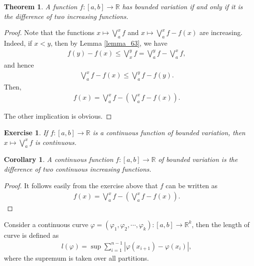 \documentclass[11pt]{book}
\newtheorem{theorem}{Theorem}[chapter]
\newtheorem{corollary}{Corollary}[theorem]
\newtheorem{exercise}{Exercise}[section]
\theoremstyle{definition}
\numberwithin{equation}{chapter}
\begin{document}
\medskip

\begin{theorem}
A function $f: [a,b] \to \mathbb{R}$ has bounded variation if and only if it is the difference of two increasing functions.
\end{theorem}
\begin{proof}
Note that the functions $x \mapsto \bigvee^x_a f$ and $x \mapsto \bigvee^x_a f - f(x)$ are increasing. Indeed, if $x < y$, then by Lemma \ref{lemma_63}, we have
\begin{align*}
    f(y) - f(x) \leq \bigvee^y_x f = \bigvee^y_a f - \bigvee^x_a f,
\end{align*}
and hence
\begin{align*}
    \bigvee^x_a f - f(x) \leq \bigvee^y_a f - f(y).
\end{align*}
Then, 
\begin{align*}
    f(x) = \bigvee^x_a f - \left(\bigvee^x_a f - f(x)\right).
\end{align*}

The other implication is obvious.
\end{proof}

\medskip

\begin{exercise}
If $f: [a,b] \to \mathbb{R}$ is a continuous function of bounded variation, then $x \mapsto \bigvee^x_a f$ is continuous.
\end{exercise}

\medskip

\begin{corollary}
A continuous function $f: [a,b] \to \mathbb{R}$ of bounded variation is the difference of two continuous increasing functions.
\end{corollary}
\begin{proof}
It follows easily from the exercise above that $f$ can be written as
\begin{align*}
    f(x) = \bigvee^x_a f - \left(\bigvee^x_a f - f(x)\right).
\end{align*}
\end{proof}

\medskip

Consider a continuous curve $\varphi = (\varphi_1, \varphi_2, \cdots, \varphi_k): [a,b] \to \mathbb{R}^k$, then the length of curve is defined as
\begin{align*}
    l(\varphi) = \sup \sum^{n-1}_{i=1} \left|\varphi(x_{i+1}) - \varphi(x_i)\right|,
\end{align*}
where the supremum is taken over all partitions.
\end{document}
